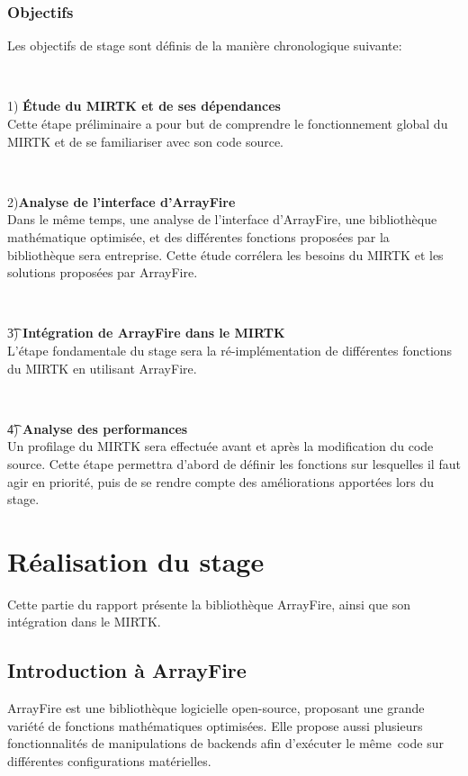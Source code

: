 \documentclass[10pt]{report}
\begin{document}
	\subsection{Objectifs} 
	Les objectifs de stage sont définis de la manière chronologique suivante:
	~\par~\par 
	1) \textbf{Étude du MIRTK et de ses dépendances} \\
	Cette étape préliminaire a pour but de comprendre le fonctionnement global du MIRTK et de se familiariser avec son code source. 
	~\par~\par 
	2)\textbf{Analyse de l'interface d'ArrayFire} \\
	Dans le même temps, une analyse de l'interface d'ArrayFire, une bibliothèque mathématique optimisée, et des différentes fonctions proposées par la bibliothèque sera entreprise. Cette étude corrélera les besoins du MIRTK et les solutions proposées par ArrayFire.
	~\par~\par 
	\t 3) \textbf{Intégration de ArrayFire dans le MIRTK} \\
	L'étape fondamentale du stage sera la ré-implémentation de différentes fonctions du MIRTK en utilisant ArrayFire.
	~\par~\par 
	\t 4) \textbf{Analyse des performances} \\
	Un profilage du MIRTK sera effectuée avant et après la modification du code source. Cette étape permettra d'abord de définir les fonctions sur lesquelles il faut agir en priorité, puis de se rendre compte des améliorations apportées lors du stage.
\newpage

\chapter{Réalisation du stage} \vspace{-0.5cm}
Cette partie du rapport présente la bibliothèque ArrayFire, ainsi que son intégration dans le MIRTK.
	\section{Introduction à ArrayFire}
	ArrayFire est une bibliothèque logicielle open-source, proposant une grande variété de fonctions mathématiques optimisées. Elle propose aussi plusieurs fonctionnalités de manipulations de backends afin d'exécuter le même code sur différentes configurations matérielles.
\end{document}
